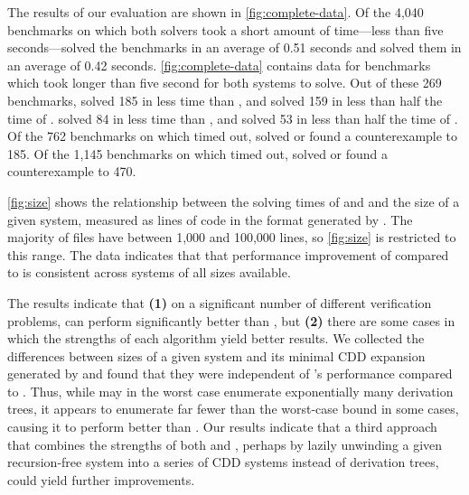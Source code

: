 \begin{figure}[t]
\begin{floatrow}[2]
  \end{floatrow}
\end{figure}
The results of our evaluation are shown in
\autoref{fig:complete-data}.
%
Of the 4,040 benchmarks on which both solvers took a short amount
of time---less than five seconds---\sys solved the benchmarks in an
average of 0.51 seconds and \duality solved them in an average of 0.42
seconds.
%
\autoref{fig:complete-data} contains data for benchmarks which took
longer than five second for both systems to solve.
%
Out of these 269 benchmarks, \sys solved 185 in less time
than \duality, and solved 159 in less than half the time of \duality.
%
\duality solved 84 in less time than \sys, and solved 53 in less than
half the time of \sys.
%
Of the 762 benchmarks on which \sys timed out, \duality solved or
found a counterexample to 185.
%
Of the 1,145 benchmarks on which \duality timed out, \sys solved or
found a counterexample to 470.

\autoref{fig:size} shows the relationship between the solving times of
\duality and \sys and the size of a given system, measured as lines of
code in the format generated by \seahorn.
%
The majority of files have between 1,000 and 100,000 lines, so
\autoref{fig:size} is restricted to this range.
%
The data indicates that that performance improvement of \sys compared
to \duality is consistent across systems of all sizes available.

The results indicate that \textbf{(1)} on a significant number of
different verification problems, \sys can perform significantly better than
\duality, but
%
\textbf{(2)} there are some cases in which the strengths of each
algorithm yield better results.
%
We collected the differences between sizes of a given system and its
minimal CDD expansion generated by \sys and found that they were
independent of \sys's performance compared to \duality.
%
Thus, while \duality may in the worst case enumerate exponentially
many derivation trees, it appears to enumerate far fewer
than the worst-case bound in some cases, causing it to perform better
than \sys.
%
Our results indicate that a third approach that combines the strengths
of both \duality and \sys, perhaps by lazily unwinding a given
recursion-free system into a series of CDD systems instead of
derivation trees, could yield further improvements.

